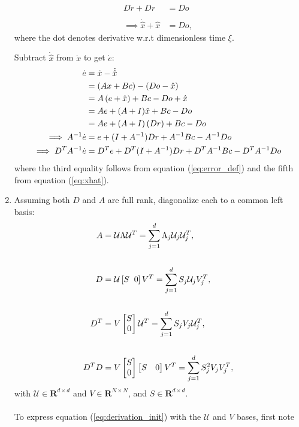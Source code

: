 \begin{enumerate}
    \begin{align*}
        D \dot{r} + D r &= Do \\
        \\
        \implies \dot{\hat{x}} + \hat{x} &= Do,
    \end{align*}
    where the dot denotes derivative w.r.t dimensionless time $\xi$.

    Subtract $\dot{\hat{x}}$ from $\dot{x}$ to get $\dot{e}$:
    \begin{align}
    \label{eq:derivation_init}
        \dot{e} &= \dot{x}-\dot{\hat{x}} \notag \\
        &= \left( Ax + Bc \right) - \left( Do - \hat{x} \right) \notag \\
        &= A\left(  e + \hat{x} \right) + Bc - Do + \hat{x} \notag \\
        &= A e + (A + I)\hat{x} + Bc - Do \notag \\
        &=  A e + (A + I) \left(Dr\right) + Bc - Do \notag \\
        \implies A^{-1}\dot{e} &= e + (I + A^{-1}) Dr + A^{-1} Bc - A^{-1}Do \notag \\ 
        \implies D^{T} A^{-1} \dot{e} &= D^T e +D^T (I + A^{-1}) Dr + D^T A^{-1}Bc - D^T A^{-1} D o 
    \end{align}
where the third equality follows from equation (\ref{eq:error_def}) and the fifth from equation (\ref{eq:xhat}).    

\item Assuming both $D$ and $A$ are full rank, diagonalize each to a common left basis:
\begin{align*}
    A &= \mathcal{U} \Lambda \mathcal{U}^T = \sum_{j=1}^d \Lambda_j \mathcal{U}_j \mathcal{U}_j^T,\\
    \\
    D &= \mathcal{U} \left[S \hspace{2mm} 0 \right]  V^T = \sum_{j=1}^d S_j \mathcal{U}_j  V_j^T,\\
    \\
    D^T &= V \begin{bmatrix} S \\ 0\end{bmatrix} \mathcal{U}^T = \sum_{j=1}^d S_j V_j  \mathcal{U}_j^T, \\
    \\
    D^T D  &= V \begin{bmatrix} S \\ 0\end{bmatrix} \begin{bmatrix} S & 0\end{bmatrix} V^T
     = \sum_{j=1}^d S_j^2 V_j V_j^T , 
\end{align*}
with $\mathcal{U} \in \mathbf{R}^{d \times d}$ and $V \in \mathbf{R}^{N \times N}$, and $S \in \mathbf{R}^{d \times d }$. \\
\\
To express equation (\ref{eq:derivation_init}) with the $\mathcal{U}$ and $V$ bases, first note


\end{enumerate}
